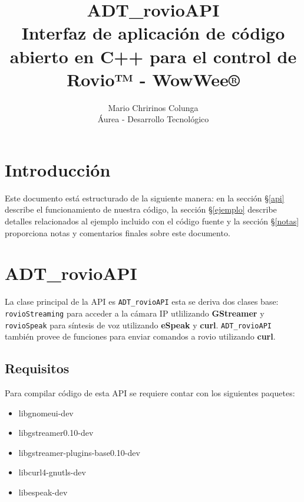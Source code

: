\documentclass[a4paper,10pt]{article}
\title{ADT\_rovioAPI\\Interfaz de aplicación de código abierto en C++  para el control de Rovio™ - WowWee®}
\author{Mario Chririnos Colunga\\ Áurea - Desarrollo Tecnológico}
\begin{document}
\maketitle

% 

\tableofcontents
\section{Introducción}

Este documento está estructurado de la siguiente manera: en la sección \S\ref{api} describe el funcionamiento de nuestra código, la sección \S\ref{ejemplo} describe detalles relacionados al ejemplo incluido con el código fuente y la sección \S\ref{notas} proporciona notas y comentarios finales sobre este documento. 

\section{ADT\_rovioAPI}
La clase principal de la API es \texttt{ADT\_rovioAPI} esta se deriva dos clases base: \texttt{rovioStreaming} para acceder a la cámara IP utlilizando \textbf{GStreamer} y \texttt{rovioSpeak} para síntesis de voz utilizando \textbf{eSpeak} y \textbf{curl}. \texttt{ADT\_rovioAPI} también provee de funciones para enviar comandos a rovio utilizando \textbf{curl}. 
\label{api}
  \subsection{Requisitos}
    Para compilar código de esta API se requiere contar con los siguientes paquetes:
     \begin{itemize}
      \item libgnomeui-dev
      \item libgstreamer0.10-dev 
      \item libgstreamer-plugins-base0.10-dev
      \item libcurl4-gnutls-dev
      \item libespeak-dev
     \end{itemize}
\end{document}

